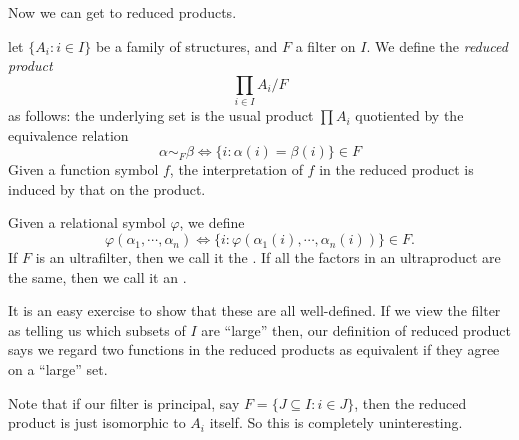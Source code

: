 \documentclass[a4paper]{article}
\begin{document}
Now we can get to reduced products.
\begin{defi}
  let $\{A_i: i \in I\}$ be a family of structures, and $F$ a filter on $I$. We define the \emph{reduced product}
  \[
    \prod_{i \in I} A_i / F
  \]
  as follows: the underlying set is the usual product $\prod A_i$ quotiented by the equivalence relation
  \[
    \alpha \sim_F \beta \Longleftrightarrow \{i : \alpha(i) = \beta(i)\} \in F
  \]
  Given a function symbol $f$, the interpretation of $f$ in the reduced product is induced by that on the product.

  Given a relational symbol $\varphi$, we define
  \[
    \varphi(\alpha_1, \cdots, \alpha_n) \Longleftrightarrow \{i : \varphi(\alpha_1(i), \cdots, \alpha_n(i))\} \in F.
  \]
  If $F$ is an ultrafilter, then we call it the . If all the factors in an ultraproduct are the same, then we call it an .
\end{defi}
It is an easy exercise to show that these are all well-defined. If we view the filter as telling us which subsets of $I$ are ``large'' then, our definition of reduced product says we regard two functions in the reduced products as equivalent if they agree on a ``large'' set.

Note that if our filter is principal, say $F = \{J \subseteq I: i \in J\}$, then the reduced product is just isomorphic to $A_i$ itself. So this is completely uninteresting.

%
%
%
%
\end{document}
